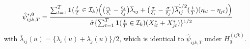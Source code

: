 \documentclass[a4paper,12pt]{article}
\numberwithin{equation}{section}
\begin{document}
{\begin{equation*}
\hat{\psi}_{ijk,T}^{*, 0} = \frac{\sum\nolimits_{t=1}^T \boldsymbol{1}(\frac{t}{T} \in \mathcal{I}_k) \Big(\big( \frac{c_i}{\hat{c}_i} - \frac{c_j}{\hat{c}_j} \big)\overline{\lambda}_{ij} + \big(\frac{\sigma}{\hat{c}_i} - \frac{\sigma}{\hat{c}_j} \big) \overline{\lambda}_{ij}^{1/2}(\frac{t}{T}) (\eta_{it} - \eta_{jt}) \Big)}{ \hat{\sigma} \{ \sum\nolimits_{t=1}^T \boldsymbol{1}(\frac{t}{T} \in \mathcal{I}_k) (X^*_{it} + X^*_{jt}) \}^{1/2}}
\end{equation*}
with $\overline{\lambda}_{ij}(u) = \{ \lambda_i(u) + \lambda_j(u) \}/2$, which is identical to $\hat{\psi}_{ijk,T}$ under $H_0^{(ijk)}$. 

%
%
%
%
%
%
}
\end{document}
